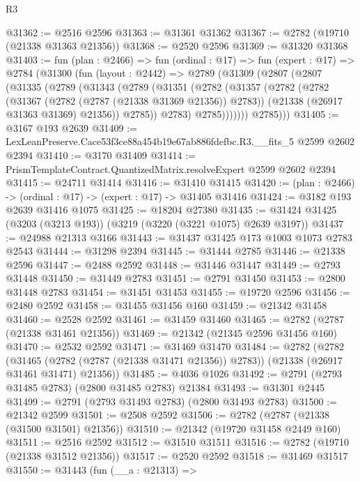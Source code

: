 \begin{lexlean}{R3}
\begin{coremodule}
@31362 := @2516 @2596
@31363 := @31361 @31362
@31367 := @2782 (@19710 (@21338 @31363 @21356))
@31368 := @2520 @2596
@31369 := @31320 @31368
@31403 := fun (plan : @2466) =>
  fun (ordinal : @17) =>
  fun (expert : @17) =>
  @2784
    (@31300
      (fun (layout : @2442) =>
      @2789
        (@31309
          (@2807
            (@2807
              (@31335
                (@2789
                  (@31343
                    (@2789
                      (@31351
                        (@2782
                          (@31357
                            (@2782
                              (@2782
                                (@31367 (@2782 (@2787 (@21338 @31369 @21356)) @2783))
                                (@21338 (@26917 @31363 @31369) @21356))
                              @2785))
                          @2783)
                        @2785)))))))
          @2785)))
@31405 := @3167 @193 @2639
@31409 := LexLeanPreserve.Cace53f3ce88a454b19e67ab886fdefbc.R3.__fits_5 @2599 @2602 @2394
@31410 := @3170 @31409
@31414 := PrismTemplateContract.QuantizedMatrix.resolveExpert @2599 @2602 @2394
@31415 := @24711 @31414
@31416 := @31410 @31415
@31420 := (plan : @2466) -> (ordinal : @17) -> (expert : @17) -> @31405 @31416
@31424 := @3182 @193 @2639 @31416 @1075
@31425 := @18204 @27380
@31435 := @31424 @31425 (@3203 (@3213 @193)) (@3219 (@3220 (@3221 @1075) @2639 @3197))
@31437 := @24988 @21313 @3166
@31443 := @31437 @31425 @173 @1003 @1073 @2783 @2543
@31444 := @31298 @2394
@31445 := @31444 @2785
@31446 := @21338 @2596
@31447 := @2488 @2592
@31448 := @31446 @31447
@31449 := @2793 @31448
@31450 := @31449 @2783
@31451 := @2791 @31450
@31453 := @2800 @31448 @2783
@31454 := @31451 @31453
@31455 := @19720 @2596
@31456 := @2480 @2592
@31458 := @31455 @31456 @160
@31459 := @21342 @31458
@31460 := @2528 @2592
@31461 := @31459 @31460
@31465 := @2782 (@2787 (@21338 @31461 @21356))
@31469 := @21342 (@21345 @2596 @31456 @160)
@31470 := @2532 @2592
@31471 := @31469 @31470
@31484 := @2782
    (@2782
      (@31465 (@2782 (@2787 (@21338 @31471 @21356)) @2783))
      (@21338 (@26917 @31461 @31471) @21356))
@31485 := @4036 @1026
@31492 := @2791 (@2793 @31485 @2783) (@2800 @31485 @2783) @21384
@31493 := @31301 @2445
@31499 := @2791 (@2793 @31493 @2783) (@2800 @31493 @2783)
@31500 := @21342 @2599
@31501 := @2508 @2592
@31506 := @2782 (@2787 (@21338 (@31500 @31501) @21356))
@31510 := @21342 (@19720 @31458 @2449 @160)
@31511 := @2516 @2592
@31512 := @31510 @31511
@31516 := @2782 (@19710 (@21338 @31512 @21356))
@31517 := @2520 @2592
@31518 := @31469 @31517
@31550 := @31443
    (fun (__a : @21313) =>

\end{coremodule}
\end{lexlean}
